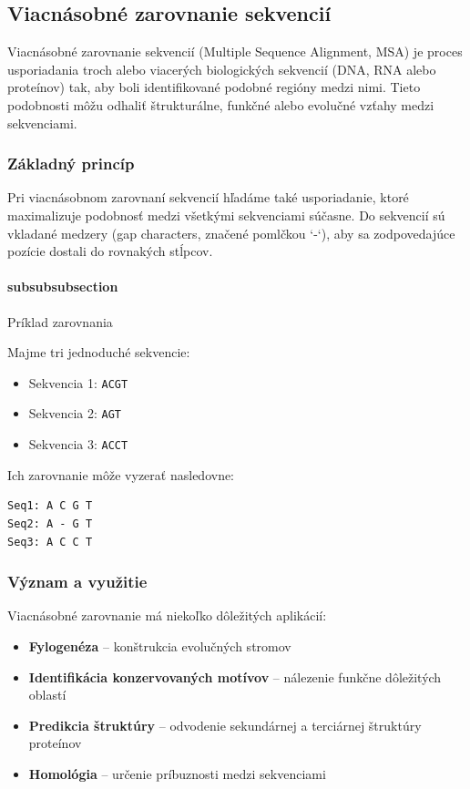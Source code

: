 \subsection{Viacnásobné zarovnanie sekvencií}

Viacnásobné zarovnanie sekvencií (Multiple Sequence Alignment, MSA) je proces usporiadania troch alebo viacerých biologických sekvencií (DNA, RNA alebo proteínov) tak, aby boli identifikované podobné regióny medzi nimi. Tieto podobnosti môžu odhaliť štrukturálne, funkčné alebo evolučné vzťahy medzi sekvenciami.

\subsubsection{Základný princíp}

Pri viacnásobnom zarovnaní sekvencií hľadáme také usporiadanie, ktoré maximalizuje podobnosť medzi všetkými sekvenciami súčasne. Do sekvencií sú vkladané medzery (gap characters, značené pomlčkou `-`), aby sa zodpovedajúce pozície dostali do rovnakých stĺpcov.

\paragraph{subsubsubsection}{Príklad zarovnania}

Majme tri jednoduché sekvencie:
\begin{itemize}
    \item Sekvencia 1: \texttt{ACGT}
    \item Sekvencia 2: \texttt{AGT}
    \item Sekvencia 3: \texttt{ACCT}
\end{itemize}

Ich zarovnanie môže vyzerať nasledovne:

\begin{verbatim}
Seq1: A C G T
Seq2: A - G T
Seq3: A C C T
\end{verbatim}

\subsubsection{Význam a využitie}

Viacnásobné zarovnanie má niekoľko dôležitých aplikácií:

\begin{itemize}
    \item \textbf{Fylogenéza} -- konštrukcia evolučných stromov
    \item \textbf{Identifikácia konzervovaných motívov} -- nálezenie funkčne dôležitých oblastí
    \item \textbf{Predikcia štruktúry} -- odvodenie sekundárnej a terciárnej štruktúry proteínov
    \item \textbf{Homológia} -- určenie príbuznosti medzi sekvenciami
\end{itemize}

